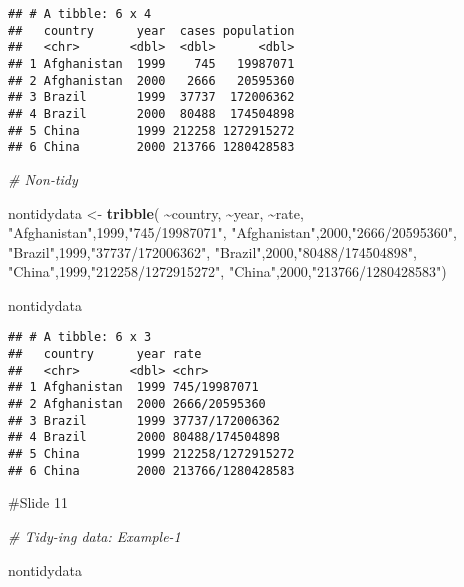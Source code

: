 \documentclass[
]{article}
\newenvironment{Shaded}{\begin{snugshade}}{\end{snugshade}}
\newcommand{\CommentTok}[1]{\textcolor[rgb]{0.56,0.35,0.01}{\textit{#1}}}
\newcommand{\DecValTok}[1]{\textcolor[rgb]{0.00,0.00,0.81}{#1}}
\newcommand{\FunctionTok}[1]{\textcolor[rgb]{0.13,0.29,0.53}{\textbf{#1}}}
\newcommand{\NormalTok}[1]{#1}
\newcommand{\OtherTok}[1]{\textcolor[rgb]{0.56,0.35,0.01}{#1}}
\newcommand{\SpecialCharTok}[1]{\textcolor[rgb]{0.81,0.36,0.00}{\textbf{#1}}}
\newcommand{\StringTok}[1]{\textcolor[rgb]{0.31,0.60,0.02}{#1}}
\begin{document}
\begin{verbatim}
## # A tibble: 6 x 4
##   country      year  cases population
##   <chr>       <dbl>  <dbl>      <dbl>
## 1 Afghanistan  1999    745   19987071
## 2 Afghanistan  2000   2666   20595360
## 3 Brazil       1999  37737  172006362
## 4 Brazil       2000  80488  174504898
## 5 China        1999 212258 1272915272
## 6 China        2000 213766 1280428583
\end{verbatim}

\begin{Shaded}
\begin{Highlighting}[]
\CommentTok{\# Non{-}tidy}

\NormalTok{nontidydata }\OtherTok{\textless{}{-}} \FunctionTok{tribble}\NormalTok{(}
\SpecialCharTok{\textasciitilde{}}\NormalTok{country, }\SpecialCharTok{\textasciitilde{}}\NormalTok{year, }\SpecialCharTok{\textasciitilde{}}\NormalTok{rate,}
\StringTok{"Afghanistan"}\NormalTok{,}\DecValTok{1999}\NormalTok{,}\StringTok{"745/19987071"}\NormalTok{,}
\StringTok{"Afghanistan"}\NormalTok{,}\DecValTok{2000}\NormalTok{,}\StringTok{"2666/20595360"}\NormalTok{,}
\StringTok{"Brazil"}\NormalTok{,}\DecValTok{1999}\NormalTok{,}\StringTok{"37737/172006362"}\NormalTok{,}
\StringTok{"Brazil"}\NormalTok{,}\DecValTok{2000}\NormalTok{,}\StringTok{"80488/174504898"}\NormalTok{,}
\StringTok{"China"}\NormalTok{,}\DecValTok{1999}\NormalTok{,}\StringTok{"212258/1272915272"}\NormalTok{,}
\StringTok{"China"}\NormalTok{,}\DecValTok{2000}\NormalTok{,}\StringTok{"213766/1280428583"}\NormalTok{)}

\NormalTok{nontidydata}
\end{Highlighting}
\end{Shaded}

\begin{verbatim}
## # A tibble: 6 x 3
##   country      year rate             
##   <chr>       <dbl> <chr>            
## 1 Afghanistan  1999 745/19987071     
## 2 Afghanistan  2000 2666/20595360    
## 3 Brazil       1999 37737/172006362  
## 4 Brazil       2000 80488/174504898  
## 5 China        1999 212258/1272915272
## 6 China        2000 213766/1280428583
\end{verbatim}

\#Slide 11

\begin{Shaded}
\begin{Highlighting}[]
\CommentTok{\# Tidy{-}ing data: Example{-}1}

\NormalTok{nontidydata}
\end{Highlighting}
\end{Shaded}
\end{document}
